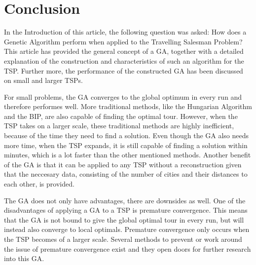 \chapter*{Conclusion}
\par
In the Introduction of this article, the following question was asked: How does a Genetic Algorithm perform when applied to the Travelling Salesman Problem?
This article has provided the general concept of a GA, together with a detailed explanation of the construction and characteristics of such an algorithm for the TSP. Further more, the performance of the constructed GA has been discussed on small and larger TSPs. 

\par
For small problems, the GA converges to the global optimum in every run and therefore performes well. More traditional methods, like the Hungarian Algorithm and the BIP, are also capable of finding the optimal tour. However, when the TSP takes on a larger scale, these traditional methods are highly inefficient, because of the time they need to find a solution. Even though the GA also needs more time, when the TSP expands, it is still capable of finding a solution within minutes, which is a lot faster than the other mentioned methods. Another benefit of the GA is that it can be applied to any TSP without a reconstruction given that the neccesary data, consisting of the number of cities and their distances to each other, is provided. 

\par
The GA does not only have advantages, there are downsides as well. One of the disadvantages of applying a GA to a TSP is premature convergence. This means that the GA is not bound to give the global optimal tour in every run, but will instead also converge to local optimals. Premature convergence only occurs when the TSP becomes of a larger scale. Several methods to prevent or work around the issue of premature convergence exist \cite{Premconvergence} and they open doors for further research into this GA. 
